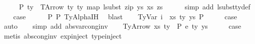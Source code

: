 \begin{isabellebody}
\ \ \isamarkupfalse%
\ \isamarkupfalse%
\ P{}{}{\isacharcolon}{\kern0pt}\ {\isachardoublequoteopen}ty{\isacharprime}{\kern0pt}\ {\isacharequal}{\kern0pt}\ TArrow\ ty{}\ ty{}\ {\isacharparenleft}{\kern0pt}map\ {\isacharparenleft}{\kern0pt}lsubst\ {\isacharparenleft}{\kern0pt}zip\ ys{\isacharprime}{\kern0pt}\ xs{\isacharprime}{\kern0pt}{\isacharparenright}{\kern0pt}{\isacharparenright}{\kern0pt}\ zs{\isacharparenright}{\kern0pt}{\isachardoublequoteclose}\isanewline
\ \ \ \ \isamarkupfalse%
\ {\isacharparenleft}{\kern0pt}simp\ add{\isacharcolon}{\kern0pt}\ lsubst{\isacharunderscore}{\kern0pt}ty{\isacharunderscore}{\kern0pt}def{\isacharparenright}{\kern0pt}\isanewline
\isanewline
\ \ \isamarkupfalse%
\ {\isacharquery}{\kern0pt}case\isanewline
\ \ \ \ \isamarkupfalse%
\ P{}{}\ P{}\ TyAlpha{\isachardot}{\kern0pt}IH\ \isamarkupfalse%
\ blast\isanewline
{}\isamarkupfalse%
\isanewline
\ \ \isamarkupfalse%
\ {\isacharparenleft}{\kern0pt}TyVar\ i\ {\isasymGamma}\ xs\ ty\ ys\ P{\isacharparenright}{\kern0pt}\isanewline
\ \ \isamarkupfalse%
\ \isamarkupfalse%
\ {\isacharquery}{\kern0pt}case\isanewline
\ \ \isamarkupfalse%
\ auto\isanewline
\ \ \isamarkupfalse%
\ {\isacharparenleft}{\kern0pt}simp\ add{\isacharcolon}{\kern0pt}\ abs{\isacharunderscore}{\kern0pt}var{\isacharunderscore}{\kern0pt}cong{\isacharunderscore}{\kern0pt}inv{\isacharparenright}{\kern0pt}\isanewline
{}\isamarkupfalse%
\isanewline
\ \ \isamarkupfalse%
\ {\isacharparenleft}{\kern0pt}TyArrow\ xs{\isacharprime}{\kern0pt}\ ty{}{\isacharprime}{\kern0pt}\ {\isasymGamma}\ P\ e{}{\isacharprime}{\kern0pt}\ ty{}{\isacharprime}{\kern0pt}\ ys{\isacharprime}{\kern0pt}{\isacharparenright}{\kern0pt}\isanewline
\ \ \isamarkupfalse%
\ \isamarkupfalse%
\ {\isacharquery}{\kern0pt}case\isanewline
\ \ \isamarkupfalse%
\ {\isacharparenleft}{\kern0pt}metis\ abs{\isacharunderscore}{\kern0pt}cong{\isacharunderscore}{\kern0pt}inv\ exp{\isachardot}{\kern0pt}inject{\isacharparenleft}{\kern0pt}{}{\isacharparenright}{\kern0pt}\ type{\isachardot}{\kern0pt}inject{\isacharparenleft}{\kern0pt}{}{\isacharparenright}{\kern0pt}{\isacharparenright}{\kern0pt}\isanewline

\end{isabellebody}
